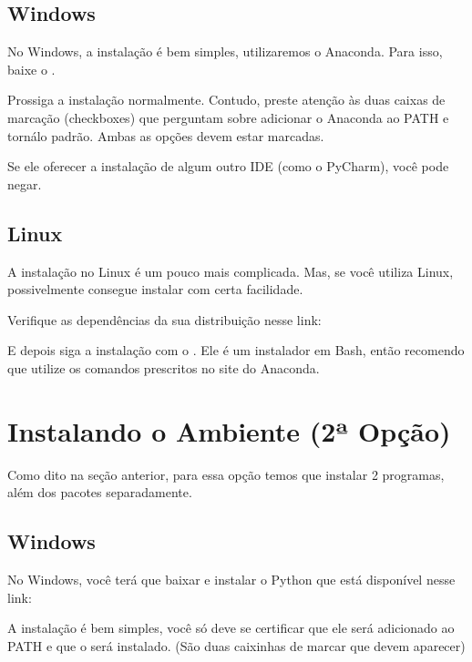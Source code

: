 \documentclass[letterpaper,10pt,english]{jupyterBook}
\begin{document}
\subsection{Windows}
\label{\detokenize{chapters/1:windows}}
\sphinxAtStartPar
No Windows, a instalação é bem simples, utilizaremos o Anaconda. Para isso, baixe o .

\sphinxAtStartPar
Prossiga a instalação normalmente. Contudo, preste atenção às duas caixas de marcação (checkboxes) que perguntam sobre adicionar o Anaconda ao PATH e torná\sphinxhyphen{}lo padrão. Ambas as opções devem estar marcadas.

\sphinxAtStartPar
Se ele oferecer a instalação de algum outro IDE (como o PyCharm), você pode negar.


\subsection{Linux}
\label{\detokenize{chapters/1:linux}}
\sphinxAtStartPar
A instalação no Linux é um pouco mais complicada. Mas, se você utiliza Linux, possivelmente consegue instalar com certa facilidade.

\sphinxAtStartPar
Verifique as dependências da sua distribuição nesse link: 

\sphinxAtStartPar
E depois siga a instalação com o . Ele é um instalador em Bash, então recomendo que utilize os comandos prescritos no site do Anaconda.


\section{Instalando o Ambiente (2ª Opção)}
\label{\detokenize{chapters/1:instalando-o-ambiente-2a-opcao}}
\sphinxAtStartPar
Como dito na seção anterior, para essa opção temos que instalar 2 programas, além dos pacotes separadamente.


\subsection{Windows}
\label{\detokenize{chapters/1:id1}}
\sphinxAtStartPar
No Windows, você terá que baixar e instalar o Python que está disponível nesse link: 

\sphinxAtStartPar
A instalação é bem simples, você só deve se certificar que ele será adicionado ao PATH e que o  será instalado. (São duas caixinhas de marcar que devem aparecer)
\end{document}
